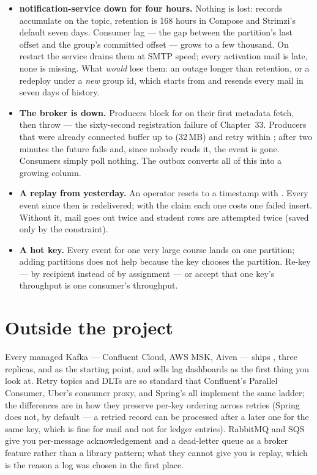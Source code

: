\begin{itemize}
  \item \textbf{notification-service down for four hours.} Nothing is
  lost: records accumulate on the topic, retention is 168 hours in
  Compose and Strimzi's default seven days. Consumer lag ---
  the gap between the partition's last offset and the group's committed
  offset --- grows to a few thousand. On restart the service drains them
  at SMTP speed; every activation mail is late, none is missing. What
  \emph{would} lose them: an outage longer than retention, or a
  redeploy under a \emph{new} group id, which starts from
   and resends every mail in seven days of history.
  \item \textbf{The broker is down.} Producers block for
   on their first metadata fetch, then throw --- the
  sixty-second registration failure of Chapter~33. Producers that were
  already connected buffer up to  (32\,MB) and retry
  within ; after two minutes the future fails
  and, since nobody reads it, the event is gone. Consumers simply poll
  nothing. The outbox converts all of this into a growing
   column.
  \item \textbf{A replay from yesterday.} An operator resets
   to a timestamp with
  . Every
  event since then is redelivered; with the 
  claim each one costs one failed insert. Without it, mail goes out
  twice and student rows are attempted twice (saved only by the
   constraint).
  \item \textbf{A hot key.} Every event for one very large course lands
  on one partition; adding partitions does not help because the key
  chooses the partition. Re-key --- by recipient instead of by
  assignment --- or accept that one key's throughput is one consumer's
  throughput.
\end{itemize}

\section{Outside the project}

Every managed Kafka --- Confluent Cloud, AWS MSK, Aiven --- ships
, three replicas, and  as the
starting point, and sells lag dashboards as the first thing you look at.
Retry topics and DLTs are so standard that Confluent's Parallel
Consumer, Uber's consumer proxy, and Spring's 
all implement the same ladder; the differences are in how they preserve
per-key ordering across retries (Spring does not, by default --- a
retried record can be processed after a later one for the same key,
which is fine for mail and not for ledger entries). RabbitMQ and SQS
give you per-message acknowledgement and a dead-letter queue as a broker
feature rather than a library pattern; what they cannot give you is
replay, which is the reason a log was chosen in the first place.

